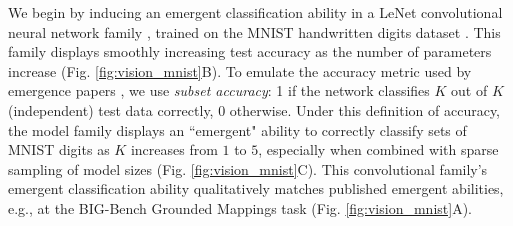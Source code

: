 We begin by inducing an emergent classification ability in a LeNet convolutional neural network family \cite{lecun1998gradient}, trained on the MNIST handwritten digits dataset \cite{lecun1998mnist}.
This family displays smoothly increasing test accuracy as the number of parameters increase (Fig. \ref{fig:vision_mnist}B).
To emulate the accuracy metric used by emergence papers \cite{ganguli2022predictability, wei2022emergent, srivastava2022beyond}, we use \textit{subset accuracy}: 1 if the network classifies $K$ out of $K$ (independent) test data correctly, 0 otherwise.
Under this definition of accuracy, the model family displays an ``emergent" ability to correctly classify sets of MNIST digits as $K$ increases from $1$ to $5$, especially when combined with sparse sampling of model sizes (Fig. \ref{fig:vision_mnist}C).
This convolutional family's emergent classification ability qualitatively matches published emergent abilities, e.g., at the BIG-Bench Grounded Mappings task \cite{wei2022emergent} (Fig. \ref{fig:vision_mnist}A).
